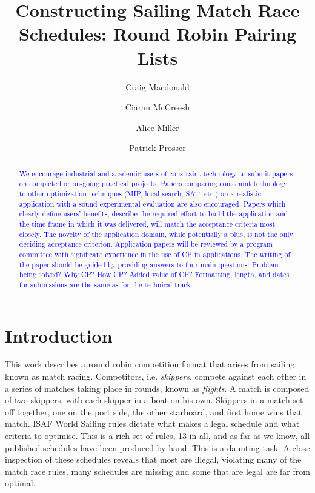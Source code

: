 \documentclass{llncs}
\newcommand{\todo}[1]{\textcolor{blue}{#1}}
\begin{document}
\title{Constructing Sailing Match Race Schedules: Round Robin Pairing Lists}
\author{Craig Macdonald \and Ciaran McCreesh \and Alice Miller \and Patrick Prosser}
\maketitle

\begin{abstract} 
\todo{We encourage industrial and academic users of constraint technology to submit papers on completed or on-going practical projects. Papers comparing constraint technology to other optimization techniques (MIP, local search, SAT, etc.) on a realistic application with a sound experimental evaluation are also encouraged. Papers which clearly define users' benefits, describe the required effort to build the application and the time frame in which it was delivered, will match the acceptance criteria most closely. The novelty of the application domain, while potentially a plus, is not the only deciding acceptance criterion. Application papers will be reviewed by a program committee with significant experience in the use of CP in applications. The writing of the paper should be guided by providing answers to four main questions: Problem being solved? Why CP? How CP? Added value of CP? Formatting, length, and dates for submissions are the same as for the technical track.}
\end{abstract}

\section{Introduction}
This work describes a round robin competition format that arises from sailing, known as match racing. Competitors, i.e. {\em skippers}, compete against each other in a series of matches taking place in rounds, known as {\em flights}.  A match is composed of two skippers, with each skipper in a boat on his own. Skippers in a match set off together, one on the port side, the other starboard, and first home wins that match. ISAF World Sailing rules dictate what makes a legal schedule and what criteria to optimise. This is a rich set of rules, 13 in all, and as far as we know, all published schedules have been produced by hand. This is a daunting task. A close inspection of these schedules reveals that most are illegal, violating many of the match race rules, many schedules are missing and some that are legal are far from optimal.
\end{document}
